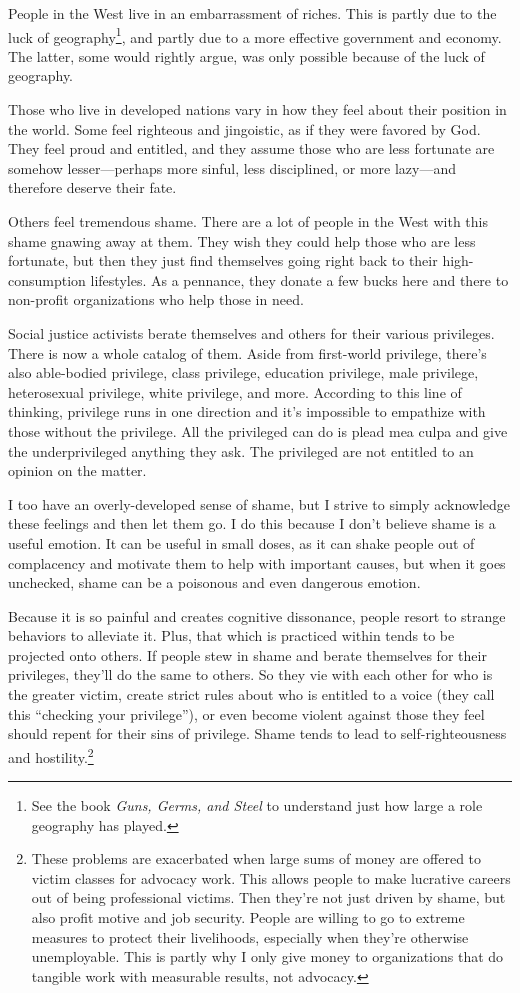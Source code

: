 People in the West live in an embarrassment of riches. This is partly due to the luck of geography\footnote{See the book \emph{Guns, Germs, and Steel} to understand just how large a role geography has played.}, and partly due to a more effective government and economy. The latter, some would rightly argue, was only possible because of the luck of geography.

Those who live in developed nations vary in how they feel about their position in the world. Some feel righteous and jingoistic, as if they were favored by God. They feel proud and entitled, and they assume those who are less fortunate are somehow lesser---perhaps more sinful, less disciplined, or more lazy---and therefore deserve their fate.

Others feel tremendous shame. There are a lot of people in the West with this shame gnawing away at them. They wish they could help those who are less fortunate, but then they just find themselves going right back to their high-consumption lifestyles. As a pennance, they donate a few bucks here and there to non-profit organizations who help those in need.

Social justice activists berate themselves and others for their various privileges. There is now a whole catalog of them. Aside from first-world privilege, there's also able-bodied privilege, class privilege, education privilege, male privilege, heterosexual privilege, white privilege, and more. According to this line of thinking, privilege runs in one direction and it's impossible to empathize with those without the privilege. All the privileged can do is plead mea culpa and give the underprivileged anything they ask. The privileged are not entitled to an opinion on the matter.

I too have an overly-developed sense of shame, but I strive to simply acknowledge these feelings and then let them go. I do this because I don't believe shame is a useful emotion. It can be useful in small doses, as it can shake people out of complacency and motivate them to help with important causes, but when it goes unchecked, shame can be a poisonous and even dangerous emotion.

Because it is so painful and creates cognitive dissonance, people resort to strange behaviors to alleviate it. Plus, that which is practiced within tends to be projected onto others. If people stew in shame and berate themselves for their privileges, they'll do the same to others. So they vie with each other for who is the greater victim, create strict rules about who is entitled to a voice (they call this ``checking your privilege''), or even become violent against those they feel should repent for their sins of privilege. Shame tends to lead to self-righteousness and hostility.\footnote{These problems are exacerbated when large sums of money are offered to victim classes for advocacy work. This allows people to make lucrative careers out of being professional victims. Then they're not just driven by shame, but also profit motive and job security. People are willing to go to extreme measures to protect their livelihoods, especially when they're otherwise unemployable. This is partly why I only give money to organizations that do tangible work with measurable results, not advocacy.}

